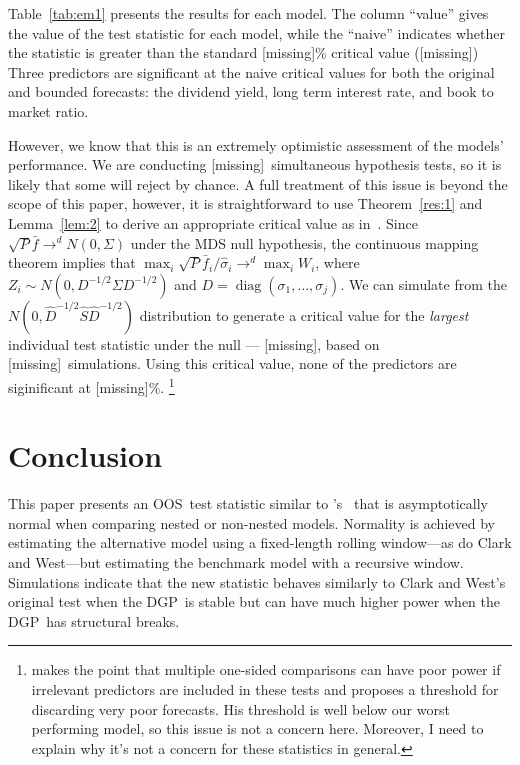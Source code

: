 \documentclass[12pt,fleqn]{article}
\newcommand\poscw{\citeauthor{ClW:06}'s \citeyearpar{ClW:06,ClW:07}}
\providecommand\bootsize{[missing]}
\providecommand\empiricalcriticalvalue{[missing]}
\providecommand\nmod{[missing]}
\providecommand\empiricaldraws{[missing]}
\providecommand\naivecriticalvalue{[missing]}
\theoremstyle{definition}
\DeclareMathOperator{\diag}{diag}
\newcommand{\fb}{\bar{f}}
\newcommand{\Sh}{\hat{S}}
\newcommand{\sh}{\hat\sigma}
\newcommand{\dgp}{DGP}
\newcommand{\oos}{OOS}
\begin{document}
Table~\ref{tab:em1} presents the results for each model.  The column
``value'' gives the value of the test statistic for each model, while
the ``naive'' indicates whether the statistic is greater than the
standard \bootsize\% critical value (\naivecriticalvalue) Three
predictors are
significant at the naive critical values for both the original and
bounded forecasts: the dividend yield, long term interest rate, and
book to market ratio.

However, we know that this is an extremely optimistic assessment of
the models' performance. We are conducting \nmod\ simultaneous
hypothesis tests, so it is likely that some will reject by chance. A
full treatment of this issue is beyond the scope of this paper,
however, it is straightforward to use Theorem~\ref{res:1} and
Lemma~\ref{lem:2} to derive an appropriate critical value as
in~\citet{Whi:00}. Since $\sqrt{P} \fb \to^d N(0, \Sigma)$ under
the MDS null hypothesis, the continuous mapping theorem implies that
$\max_i \sqrt{P} \fb_i/\sh_i \to^d \max_i W_i$, where $Z_i
\sim N(0, D^{-1/2} \Sigma D^{-1/2})$ and $D = \diag(\sigma_1, \dots,
\sigma_j)$. We can simulate from the $N(0, \hat D^{-1/2} \Sh
\hat D^{-1/2})$ distribution to generate a critical value for the
\emph{largest} individual test statistic under the null ---
\empiricalcriticalvalue, based on \empiricaldraws\ simulations. Using
this critical value, none of the predictors are siginificant at
\bootsize\%.%
\footnote{\citet{Han:05} makes the point that multiple one-sided
  comparisons can have poor power if irrelevant predictors are
  included in these tests and proposes a threshold for discarding very
  poor forecasts. His threshold is well below our worst performing
  model, so this issue is not a concern here. Moreover, I need to
  explain why it's not a concern for these statistics in general.} %

\section{Conclusion}\label{sec:4}
This paper presents an \oos\ test statistic similar to \poscw\ that is
asymptotically normal when comparing nested or non-nested models.
Normality is achieved by estimating the alternative model using a
fixed-length rolling window---as do Clark and West---but estimating
the benchmark model with a recursive window.  Simulations indicate
that the new statistic behaves similarly to Clark and West's original
test when the \dgp\ is stable but can have much higher power when the 
\dgp\ has structural breaks.
\end{document}

